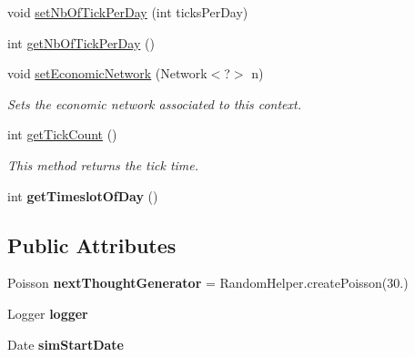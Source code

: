 \begin{DoxyCompactItemize}
\item 
void \hyperlink{classuk_1_1ac_1_1dmu_1_1iesd_1_1cascade_1_1context_1_1_adoption_context_a95e9b96c324299592a210b75ff00a99f}{set\-Nb\-Of\-Tick\-Per\-Day} (int ticks\-Per\-Day)
\item 
int \hyperlink{classuk_1_1ac_1_1dmu_1_1iesd_1_1cascade_1_1context_1_1_adoption_context_a8283e8e451e301a4e07f9004e4bdfbaf}{get\-Nb\-Of\-Tick\-Per\-Day} ()
\item 
void \hyperlink{classuk_1_1ac_1_1dmu_1_1iesd_1_1cascade_1_1context_1_1_adoption_context_addd8e9731d1ae5b1e6d58ce93dd6f021}{set\-Economic\-Network} (Network$<$?$>$ n)
\begin{DoxyCompactList}\small\item\em Sets the economic network associated to this context. \end{DoxyCompactList}\item 
int \hyperlink{classuk_1_1ac_1_1dmu_1_1iesd_1_1cascade_1_1context_1_1_adoption_context_a8ecf8ea6ccf7f72e98a9213251e8ba31}{get\-Tick\-Count} ()
\begin{DoxyCompactList}\small\item\em This method returns the tick time. \end{DoxyCompactList}\item 
\hypertarget{classuk_1_1ac_1_1dmu_1_1iesd_1_1cascade_1_1context_1_1_adoption_context_a36ace547f9ae4933530cd35e4d65f268}{int {\bfseries get\-Timeslot\-Of\-Day} ()}\label{classuk_1_1ac_1_1dmu_1_1iesd_1_1cascade_1_1context_1_1_adoption_context_a36ace547f9ae4933530cd35e4d65f268}

\end{DoxyCompactItemize}
\subsection*{Public Attributes}
\begin{DoxyCompactItemize}
\item 
\hypertarget{classuk_1_1ac_1_1dmu_1_1iesd_1_1cascade_1_1context_1_1_adoption_context_ab8133834bcab82369470e82475dc7c23}{Poisson {\bfseries next\-Thought\-Generator} = Random\-Helper.\-create\-Poisson(30.)}\label{classuk_1_1ac_1_1dmu_1_1iesd_1_1cascade_1_1context_1_1_adoption_context_ab8133834bcab82369470e82475dc7c23}

\item 
\hypertarget{classuk_1_1ac_1_1dmu_1_1iesd_1_1cascade_1_1context_1_1_adoption_context_a2b1c8b14a2d9a219d05dfedb54f7155a}{Logger {\bfseries logger}}\label{classuk_1_1ac_1_1dmu_1_1iesd_1_1cascade_1_1context_1_1_adoption_context_a2b1c8b14a2d9a219d05dfedb54f7155a}

\item 
\hypertarget{classuk_1_1ac_1_1dmu_1_1iesd_1_1cascade_1_1context_1_1_adoption_context_a290f943a0fe106b4415d6d780f66764c}{Date {\bfseries sim\-Start\-Date}}\label{classuk_1_1ac_1_1dmu_1_1iesd_1_1cascade_1_1context_1_1_adoption_context_a290f943a0fe106b4415d6d780f66764c}

\end{DoxyCompactItemize}
